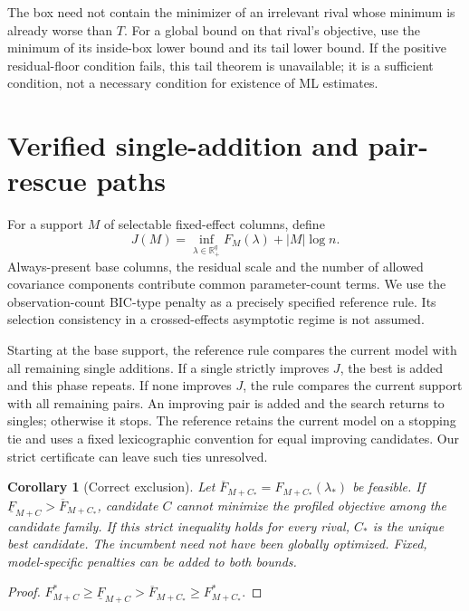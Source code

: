 \documentclass[preprint,11pt,numbers]{elsarticle}
\newtheorem{corollary}[theorem]{Corollary}
\theoremstyle{remark}\newtheorem{remark}[theorem]{Remark}
\newcommand{\R}{\mathbb R}
\begin{document}
The box need not contain the minimizer of an irrelevant rival whose minimum is
already worse than $T$. For a global bound on that rival's objective, use the
minimum of its inside-box lower bound and its tail lower bound. If the positive
residual-floor condition fails, this tail theorem is unavailable; it is a
sufficient condition, not a necessary condition for existence of ML estimates.

\section{Verified single-addition and pair-rescue paths}
For a support $M$ of selectable fixed-effect columns, define
\begin{equation}\label{eq:bic}
J(M)=\inf_{\lambda\in\R_+^q}F_M(\lambda)+|M|\log n.
\end{equation}
Always-present base columns, the residual scale and the number of allowed
covariance components contribute common parameter-count terms. We use the
observation-count BIC-type penalty as a precisely specified reference rule.
Its selection consistency in a crossed-effects asymptotic regime is not assumed.

Starting at the base support, the reference rule compares the current model
with all remaining single additions. If a single strictly improves $J$, the
best is added and this phase repeats. If none improves $J$, the rule compares
the current support with all remaining pairs. An improving pair is added and
the search returns to singles; otherwise it stops. The reference retains the
current model on a stopping tie and uses a fixed lexicographic convention for
equal improving candidates. Our strict certificate can leave such ties unresolved.
\begin{corollary}[Correct exclusion]\label{cor:exclude}
Let $\overline F_{M+C_*}=F_{M+C_*}(\lambda_*)$ be feasible. If
$\underline F_{M+C}>\overline F_{M+C_*}$, candidate $C$ cannot minimize the profiled
objective among the candidate family. If this strict inequality holds for every
rival, $C_*$ is the unique best candidate. The incumbent need not have been
globally optimized. Fixed, model-specific penalties can be added to both bounds.
\end{corollary}
\begin{proof}
$F_{M+C}^*\geq\underline F_{M+C}>\overline F_{M+C_*}\geq F_{M+C_*}^*$.
\end{proof}
\end{document}
